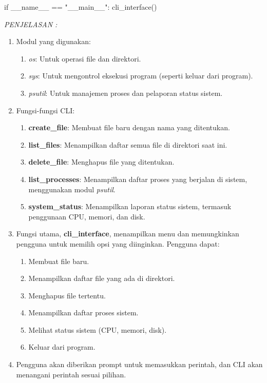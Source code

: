 \documentclass[12pt]{article}
\begin{document}
\begin{enumerate}
\begin{python}
if __name__ == "__main__":
    cli_interface()
\end{python}

\textit{PENJELASAN : }
\begin{enumerate}
    \item Modul yang digunakan:
        \begin{enumerate}
            \item \textit{os}: Untuk operasi file dan direktori.
            \item \textit{sys}: Untuk mengontrol eksekusi program (seperti keluar dari program).
            \item \textit{psutil}: Untuk manajemen proses dan pelaporan status sistem.
        \end{enumerate}
    \item Fungsi-fungsi CLI:
        \begin{enumerate}
            \item \textbf{create\_file}: Membuat file baru dengan nama yang ditentukan.
            \item \textbf{list\_files}: Menampilkan daftar semua file di direktori saat ini.
            \item \textbf{delete\_file}: Menghapus file yang ditentukan.
            \item \textbf{list\_processes}: Menampilkan daftar proses yang berjalan di sistem, menggunakan modul \textit{psutil}.
            \item \textbf{system\_status}: Menampilkan laporan status sistem, termasuk penggunaan CPU, memori, dan disk.
        \end{enumerate}
    \item Fungsi utama, \textbf{cli\_interface}, menampilkan menu dan memungkinkan pengguna untuk memilih opsi yang diinginkan. Pengguna dapat:
        \begin{enumerate}
            \item Membuat file baru.
            \item Menampilkan daftar file yang ada di direktori.
            \item Menghapus file tertentu.
            \item Menampilkan daftar proses sistem.
            \item Melihat status sistem (CPU, memori, disk).
            \item Keluar dari program.
        \end{enumerate}
    \item Pengguna akan diberikan prompt untuk memasukkan perintah, dan CLI akan menangani perintah sesuai pilihan.
\end{enumerate}
\end{enumerate}
\end{document}
